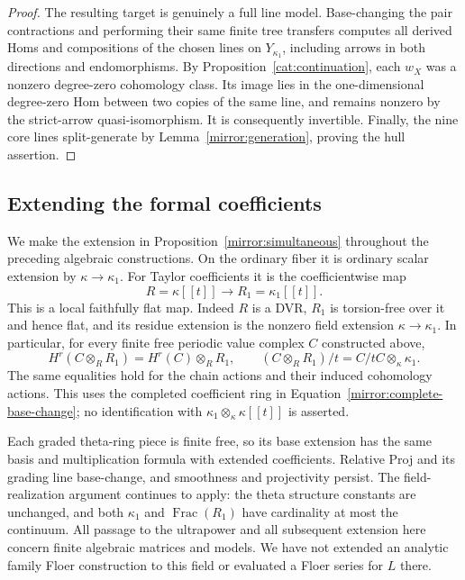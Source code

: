 \documentclass[11pt]{article}
\theoremstyle{definition}
\theoremstyle{remark}
\numberwithin{equation}{section}
\begin{document}
\begin{proof}
The resulting target is genuinely a full line model.  Base-changing
the pair contractions and performing their same finite tree
transfers computes all derived Homs and compositions of the chosen
lines on $Y_{\kappa_1}$, including arrows in both directions and
endomorphisms.  By Proposition~\ref{cat:continuation}, each $w_X$
was a nonzero degree-zero cohomology class.
Its image lies in the one-dimensional degree-zero Hom between two
copies of the same line, and remains nonzero by the strict-arrow
quasi-isomorphism.  It is consequently invertible.  Finally, the
nine core lines split-generate by Lemma~\ref{mirror:generation},
proving the hull assertion.
\end{proof}

\subsection{Extending the formal coefficients}

We make the extension in Proposition~\ref{mirror:simultaneous}
throughout the preceding algebraic constructions.  On the ordinary
fiber it is ordinary scalar extension by $\kappa\to\kappa_1$.
For Taylor coefficients it is the coefficientwise map
\begin{equation}
 R=\kappa[[t]]\longrightarrow R_1=\kappa_1[[t]].
 \label{mirror:complete-base-change}
\end{equation}
This is a local faithfully flat map.  Indeed $R$ is a DVR, $R_1$
is torsion-free over it and hence flat, and its residue extension
is the nonzero field extension $\kappa\to\kappa_1$.  In particular,
for every finite free periodic value complex $C$ constructed above,
\[
 H^r(C\otimes_RR_1)=H^r(C)\otimes_RR_1,
 \qquad
 (C\otimes_RR_1)/t=C/tC\otimes_\kappa\kappa_1.
\]
The same equalities hold for the chain actions and their induced
cohomology actions.  This uses the completed coefficient ring in
Equation~\eqref{mirror:complete-base-change}; no identification with
$\kappa_1\otimes_\kappa\kappa[[t]]$ is asserted.

Each graded theta-ring piece is finite free, so its base extension
has the same basis and multiplication formula with extended
coefficients.  Relative Proj and its grading line base-change, and
smoothness and projectivity persist.  The field-realization argument
continues to apply: the theta structure constants are unchanged,
and both $\kappa_1$ and $\operatorname{Frac}(R_1)$ have cardinality
at most the continuum.  All passage to the ultrapower and all
subsequent extension here concern finite algebraic matrices and
models.  We have not extended an analytic family Floer construction
to this field or evaluated a Floer series for $L$ there.
\end{document}
